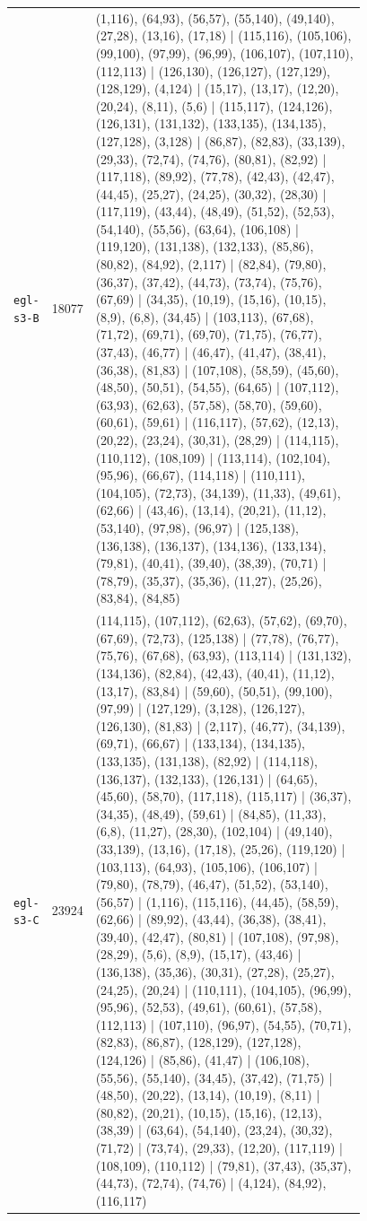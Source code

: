 \begin{landscape}
\begin{longtable}{lr>{\tiny\raggedright\arraybackslash}p{0.78\linewidth}}
\texttt{egl-s3-B} & 18077 & (1,116), (64,93), (56,57), (55,140), (49,140), (27,28), (13,16), (17,18) | (115,116), (105,106), (99,100), (97,99), (96,99), (106,107), (107,110), (112,113) | (126,130), (126,127), (127,129), (128,129), (4,124) | (15,17), (13,17), (12,20), (20,24), (8,11), (5,6) | (115,117), (124,126), (126,131), (131,132), (133,135), (134,135), (127,128), (3,128) | (86,87), (82,83), (33,139), (29,33), (72,74), (74,76), (80,81), (82,92) | (117,118), (89,92), (77,78), (42,43), (42,47), (44,45), (25,27), (24,25), (30,32), (28,30) | (117,119), (43,44), (48,49), (51,52), (52,53), (54,140), (55,56), (63,64), (106,108) | (119,120), (131,138), (132,133), (85,86), (80,82), (84,92), (2,117) | (82,84), (79,80), (36,37), (37,42), (44,73), (73,74), (75,76), (67,69) | (34,35), (10,19), (15,16), (10,15), (8,9), (6,8), (34,45) | (103,113), (67,68), (71,72), (69,71), (69,70), (71,75), (76,77), (37,43), (46,77) | (46,47), (41,47), (38,41), (36,38), (81,83) | (107,108), (58,59), (45,60), (48,50), (50,51), (54,55), (64,65) | (107,112), (63,93), (62,63), (57,58), (58,70), (59,60), (60,61), (59,61) | (116,117), (57,62), (12,13), (20,22), (23,24), (30,31), (28,29) | (114,115), (110,112), (108,109) | (113,114), (102,104), (95,96), (66,67), (114,118) | (110,111), (104,105), (72,73), (34,139), (11,33), (49,61), (62,66) | (43,46), (13,14), (20,21), (11,12), (53,140), (97,98), (96,97) | (125,138), (136,138), (136,137), (134,136), (133,134), (79,81), (40,41), (39,40), (38,39), (70,71) | (78,79), (35,37), (35,36), (11,27), (25,26), (83,84), (84,85) \\[2pt]
\texttt{egl-s3-C} & 23924 & (114,115), (107,112), (62,63), (57,62), (69,70), (67,69), (72,73), (125,138) | (77,78), (76,77), (75,76), (67,68), (63,93), (113,114) | (131,132), (134,136), (82,84), (42,43), (40,41), (11,12), (13,17), (83,84) | (59,60), (50,51), (99,100), (97,99) | (127,129), (3,128), (126,127), (126,130), (81,83) | (2,117), (46,77), (34,139), (69,71), (66,67) | (133,134), (134,135), (133,135), (131,138), (82,92) | (114,118), (136,137), (132,133), (126,131) | (64,65), (45,60), (58,70), (117,118), (115,117) | (36,37), (34,35), (48,49), (59,61) | (84,85), (11,33), (6,8), (11,27), (28,30), (102,104) | (49,140), (33,139), (13,16), (17,18), (25,26), (119,120) | (103,113), (64,93), (105,106), (106,107) | (79,80), (78,79), (46,47), (51,52), (53,140), (56,57) | (1,116), (115,116), (44,45), (58,59), (62,66) | (89,92), (43,44), (36,38), (38,41), (39,40), (42,47), (80,81) | (107,108), (97,98), (28,29), (5,6), (8,9), (15,17), (43,46) | (136,138), (35,36), (30,31), (27,28), (25,27), (24,25), (20,24) | (110,111), (104,105), (96,99), (95,96), (52,53), (49,61), (60,61), (57,58), (112,113) | (107,110), (96,97), (54,55), (70,71), (82,83), (86,87), (128,129), (127,128), (124,126) | (85,86), (41,47) | (106,108), (55,56), (55,140), (34,45), (37,42), (71,75) | (48,50), (20,22), (13,14), (10,19), (8,11) | (80,82), (20,21), (10,15), (15,16), (12,13), (38,39) | (63,64), (54,140), (23,24), (30,32), (71,72) | (73,74), (29,33), (12,20), (117,119) | (108,109), (110,112) | (79,81), (37,43), (35,37), (44,73), (72,74), (74,76) | (4,124), (84,92), (116,117) \\[2pt]

\end{longtable}
\end{landscape}
